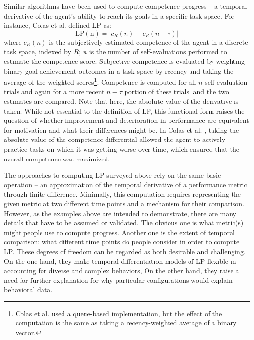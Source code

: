 Similar algorithms have been used to compute competence progress \cite{baranes_active_2013,santucci_which_2013,colas_curious_2019,forestier_intrinsically_2020} -- a temporal derivative of the agent's ability to reach its goals in a specific task space. For instance, Colas et al. \cite{colas_curious_2019} defined \ac{LP} as:
\begin{equation}
    \mathrm{LP(n)} = |c_R(n) - c_R(n-\tau)|
\end{equation}
where $c_R(n)$ is the subjectively estimated competence of the agent in a discrete task space, indexed by $R$; $n$ is the number of self-evaluations performed to estimate the competence score. Subjective competence is evaluated by weighting binary goal-achievement outcomes in a task space by recency and taking the average of the weighted scores\footnote{Colas et al. \cite{colas_curious_2019} used a queue-based implementation, but the effect of the computation is the same as taking a recency-weighted average of a binary vector.}. Competence is computed for all $n$ self-evaluation trials and again for a more recent $n-\tau$ portion of these trials, and the two estimates are compared. Note that here, the absolute value of the derivative is taken. While not essential to the definition of \ac{LP}, this functional form raises the question of whether improvement and deterioration in performance are equivalent for motivation and what their differences might be. In Colas et al. \cite{colas_curious_2019}, taking the absolute value of the competence differential allowed the agent to actively practice tasks on which it was getting worse over time, which ensured that the overall competence was maximized.

The approaches to computing \ac{LP} surveyed above rely on the same basic operation -- an approximation of the temporal derivative of a performance metric through finite difference. Minimally, this computation requires representing the given metric at two different time points and a mechanism for their comparison. However, as the examples above are intended to demonstrate, there are many details that have to be assumed or validated. The obvious one is what metric(s) might people use to compute progress. Another one is the extent of temporal comparison: what different time points do people consider in order to compute \ac{LP}. These degrees of freedom can be regarded as both desirable and challenging. On the one hand, they make temporal-differentiation models of \ac{LP} flexible in accounting for diverse and complex behaviors, On the other hand, they raise a need for further explanation for why particular configurations would explain behavioral data.

